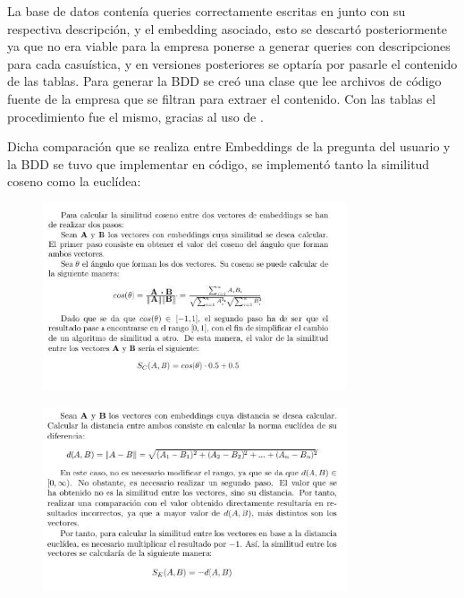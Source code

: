 La base de datos contenía queries correctamente escritas en \href{https://dotnet.microsoft.com/es-es/languages/csharp}{} junto con su respectiva descripción, y el embedding asociado, esto se descartó posteriormente ya que no era viable para la empresa ponerse a generar queries con descripciones para cada casuística, y en versiones posteriores se optaría por pasarle el contenido de las tablas. Para generar la BDD se creó una clase que lee archivos de código fuente \href{https://dotnet.microsoft.com/es-es/languages/csharp}{} de la empresa que se filtran para extraer el contenido. Con las tablas el procedimiento fue el mismo, gracias al uso de \href{https://en.wikipedia.org/wiki/Entity_Framework}{}. 

\newpage
Dicha comparación que se realiza entre Embeddings de la pregunta del usuario y la BDD se tuvo que implementar en código, se implementó tanto la similitud coseno como la euclídea:


\begin{figure}[htbp]
    \centering
    \includegraphics[width=0.8\textwidth]{Chapters/cap4.PNG}
    \label{fig:mi_imagen}
\end{figure}

\begin{figure}[htbp]
    \centering
    \includegraphics[width=0.8\textwidth]{Chapters/cap5.PNG}
    \label{fig:mi_imagen2}
\end{figure}

